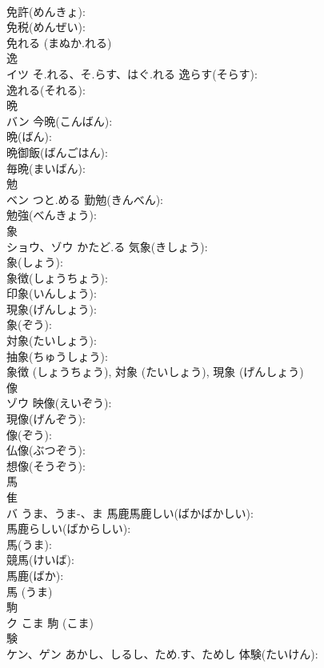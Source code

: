 \documentclass[8pt]{extreport}
\begin{document}
\begin{CJK}{UTF8}{min}
\\	免許(めんきょ): 
\\	免税(めんぜい): 
\\	免れる (まぬか.れる)
\\	逸			
\\	イツ	そ.れる、そ.らす、はぐ.れる	逸らす(そらす): 
\\	逸れる(それる): 
\\	晩			
\\	バン		今晩(こんばん): 
\\	晩(ばん): 
\\	晩御飯(ばんごはん): 
\\	毎晩(まいばん): 
\\	勉			
\\	ベン	つと.める	勤勉(きんべん): 
\\	勉強(べんきょう): 
\\	象			
\\	ショウ、ゾウ	かたど.る	気象(きしょう): 
\\	象(しょう): 
\\	象徴(しょうちょう): 
\\	印象(いんしょう): 
\\	現象(げんしょう): 
\\	象(ぞう): 
\\	対象(たいしょう): 
\\	抽象(ちゅうしょう): 
\\	象徴 (しょうちょう), 対象 (たいしょう), 現象 (げんしょう)
\\	像			
\\	ゾウ		映像(えいぞう): 
\\	現像(げんぞう): 
\\	像(ぞう): 
\\	仏像(ぶつぞう): 
\\	想像(そうぞう): 
\\	馬			
\\	隹 
\\	バ	うま、うま-、ま	馬鹿馬鹿しい(ばかばかしい): 
\\	馬鹿らしい(ばからしい): 
\\	馬(うま): 
\\	競馬(けいば): 
\\	馬鹿(ばか): 
\\	馬 (うま)
\\	駒			
\\	ク	こま		駒 (こま)
\\	験			
\\	ケン、ゲン	あかし、しるし、ため.す、ためし	体験(たいけん): 

\end{CJK}
\end{document}
